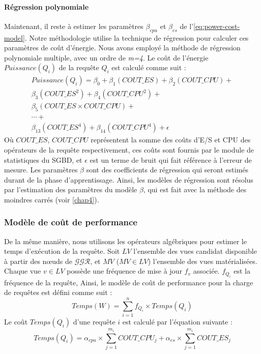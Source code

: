 \paragraph{Régression polynomiale}\label{subsubsec:PolynomialRegression}
Maintenant, il reste à estimer les paramètres $\beta_{cpu} $ et $\beta_{es} $ de l'\ref{eq:power-cost-model}.
Notre méthodologie utilise la technique de régression pour calculer ces paramètres de coût d'énergie. Nous avons employé la méthode de régression polynomiale multiple, avec un ordre de \textit{m=4}. Le coût de l'énergie $Puissance(Q_i)$ de la requête $Q_i$ est calculé comme suit :
\begin{equation} \label{eq:poly-reg-equation-mv}
\begin{aligned}
Puissance(Q_i) = \beta_0 + \beta_1 (COUT\_ES) + \beta_2 (COUT\_CPU) + \\
\beta_3 (COUT\_ES^2) + \beta_4 (COUT\_CPU^2) + \\
\beta_5 (COUT\_ES \times COUT\_CPU) + \\
\cdots + \\
\beta_{13} (COUT\_ES^4) + \beta_{14} (COUT\_CPU^4) + \epsilon
\end{aligned}
\end{equation}
Où $COUT\_ES $, $COUT\_CPU$ représentent la somme des coûts d'E/S et CPU des opérateurs de la requête respectivement, ces coûts sont fournis par le module de statistiques du SGBD, et $\epsilon$ est un terme de bruit qui fait référence à l'erreur de mesure. Les paramètres $\beta$ sont des coefficients de régression qui seront estimés durant de la phase d'apprentissage. Ainsi, les modèles de régression sont résolus par l'estimation des paramètres du modèle $\beta$, qui est fait avec la méthode des moindres carrés (voir \ref{chap4}).

\subsubsection{Modèle de coût de performance}\label{subsec:PerformanceCostModel}
De la même manière, nous utilisons les opérateurs algébriques pour estimer le temps d'exécution de la requête. Soit $LV$ l'ensemble des vues candidat disponible à partir des nœuds de $\mathcal{GGR}$, et $MV$ ($MV \in LV$) l'ensemble des vues matérialisées. Chaque vue $v \in LV$ possède une fréquence de mise à jour $f_v$ associée. $f_{Q_i}$ est la fréquence de la requête, Ainsi, le modèle de coût de performance pour la charge de requêtes est défini comme suit :
\begin{equation}
Temps(W) =  \sum_{i=1}^{n} f_{Q_i} \times Temps(Q_i)
\end{equation}
Le coût $Temps({Q_i})$ d'une requête $i$ est calculé par l'équation suivante :
\begin{equation} \label{eq:time-cost-model}
Temps({Q_i}) = \alpha_{cpu} \times \sum_{j=1}^{m_i} COUT\_CPU_j + \alpha_{es} \times  \sum_{j=1}^{m_i} COUT\_ES_j
\end{equation}

